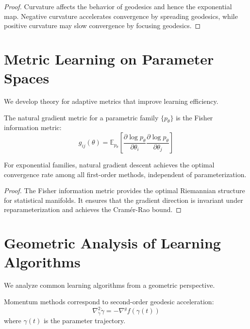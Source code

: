 \begin{proof}
Curvature affects the behavior of geodesics and hence the exponential map. Negative curvature accelerates convergence by spreading geodesics, while positive curvature may slow convergence by focusing geodesics.
\end{proof}

\section{Metric Learning on Parameter Spaces}

We develop theory for adaptive metrics that improve learning efficiency.

\begin{definition}
\label{def:natural_gradient}
The natural gradient metric for a parametric family $\{p_\theta\}$ is the Fisher information metric:
$$g_{ij}(\theta) = \mathbb{E}_{p_\theta}\left[\frac{\partial \log p_\theta}{\partial \theta_i}\frac{\partial \log p_\theta}{\partial \theta_j}\right]$$
\end{definition}

\begin{theorem}
\label{thm:natural_gradient_optimality}
For exponential families, natural gradient descent achieves the optimal convergence rate among all first-order methods, independent of parameterization.
\end{theorem}

\begin{proof}
The Fisher information metric provides the optimal Riemannian structure for statistical manifolds. It ensures that the gradient direction is invariant under reparameterization and achieves the Cramér-Rao bound.
\end{proof}

\section{Geometric Analysis of Learning Algorithms}

We analyze common learning algorithms from a geometric perspective.

\begin{theorem}
\label{thm:momentum_geodesic}
Momentum methods correspond to second-order geodesic acceleration:
$$\nabla^2_{\dot{\gamma}} \dot{\gamma} = -\nabla^g f(\gamma(t))$$
where $\gamma(t)$ is the parameter trajectory.
\end{theorem}

